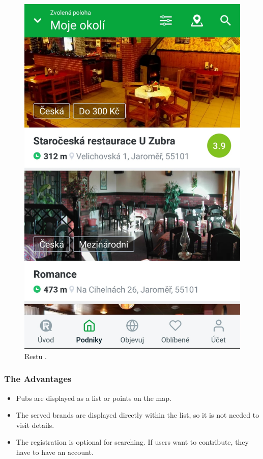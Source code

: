 \begin{figure}[ht]
\begin{minipage}{0.45\linewidth}
        \includegraphics[width=0.75\linewidth]{img/analysis/app-restu.jpg}
        \caption{Restu \cite{app-restu}.}
        \label{fig:restu}
    \end{minipage}
\end{figure}


\subsubsection{The Advantages}
\begin{itemize}
    \item Pubs are displayed as a list or points on the map.
    \item The served brands are displayed directly within the list, so it is not needed to visit details.
    \item The registration is optional for searching. If users want to contribute, they have to have an account.
\end{itemize}


